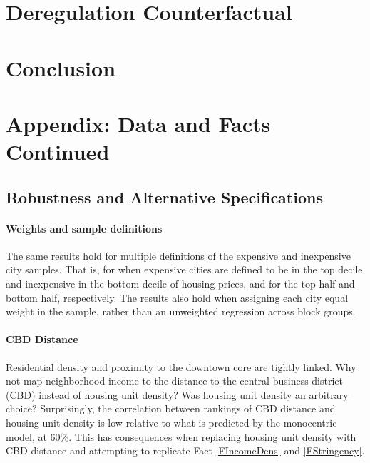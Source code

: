 \documentclass[]{article}
\begin{document}
\paragraph*{}


\section{Deregulation Counterfactual}

\section{Conclusion}

	\newpage\newpage
	\scriptsize
	
	
	\newpage
	\appendix
	\normalsize
	\section{Appendix: Data and Facts Continued}\label{DataandFactsContinued}
	
	\subsection{Robustness and Alternative Specifications}\label{Appendix:Robustness}
	
	\paragraph*{Weights and sample definitions} The same results hold for multiple definitions of the expensive and inexpensive city samples. That is, for when expensive cities are defined to be in the top decile and inexpensive in the bottom decile of housing prices, and for the top half and bottom half, respectively. The results also hold when assigning each city equal weight in the sample, rather than an unweighted regression across block groups. 
	
	
	\paragraph*{CBD Distance}
	Residential density and proximity to the downtown core are tightly linked. Why not map neighborhood income to the distance to the central business district (CBD) instead of housing unit density? Was housing unit density an arbitrary choice? Surprisingly, the correlation between rankings of CBD distance and housing unit density is low relative to what is predicted by the monocentric model, at 60\%. This has consequences when replacing housing unit density with CBD distance and attempting to replicate Fact \ref{FIncomeDens} and \ref{FStringency}. 
	
\end{document}
